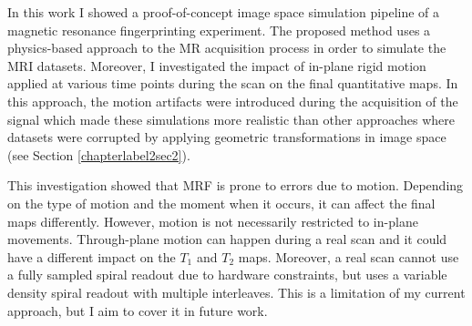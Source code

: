 
In this work I showed a proof-of-concept image space simulation pipeline of a magnetic resonance fingerprinting experiment.
The proposed method uses a physics-based approach to the MR acquisition process in order to simulate the MRI datasets.
Moreover, I investigated the impact of in-plane rigid motion applied at various time points during the scan on the final quantitative maps.
In this approach, the motion artifacts were introduced during the acquisition of the signal which made these simulations more realistic than other approaches where datasets were corrupted by applying geometric transformations in image space (see Section \ref{chapterlabel2sec2}).

\hfill

This investigation showed that MRF is prone to errors due to motion.
Depending on the type of motion and the moment when it occurs, it can affect the final maps differently.
However, motion is not necessarily restricted to in-plane movements.
Through-plane motion can happen during a real scan and it could have a different impact on the $T_1$ and $T_2$ maps.
Moreover, a real scan cannot use a fully sampled spiral readout due to hardware constraints, but uses a variable density spiral readout with multiple interleaves.
This is a limitation of my current approach, but I aim to cover it in future work.